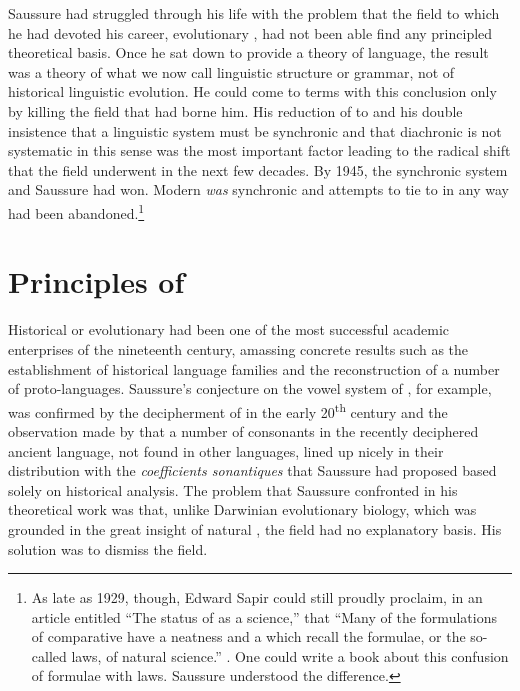 \documentclass[output=paper,
modfonts
]{LSP/langsci}
\begin{document}
Saussure had struggled through his life with the problem that the field to which he had devoted his career, evolutionary , had not been able find any principled theoretical basis. Once he sat down to provide a theory of language, the result was a theory of what we now call linguistic structure or grammar, not of historical linguistic evolution. He could come to terms with this conclusion only by killing the field that had borne him. His reduction of  to  and his double insistence that a linguistic system must be synchronic and that diachronic  is not systematic in this sense was the most important factor leading to the radical shift that the field underwent in the next few decades. By 1945, the synchronic system and Saussure had won. Modern  \textit{was} synchronic  and attempts to tie  to  in any way had been abandoned.\footnote{As late as 1929, though, Edward Sapir could still proudly proclaim, in an article entitled ``The status of  as a science,'' that ``Many of the formulations of comparative   have a neatness and a  which recall the formulae, or the so-called laws, of natural science.'' \citep[160]{sapir1929}. One could write a book about this confusion of formulae with laws. Saussure understood the difference.}

\section{Principles of }

Historical or evolutionary  had been one of the most successful academic enterprises of the nineteenth century, amassing concrete results such as the establishment of historical language families and the reconstruction of a number of proto-languages.  Saussure's conjecture on the vowel system of , for example, was confirmed by the decipherment of  in the early 20\textsuperscript{th} century and the observation made by \citet{Kurylowicz1935} that a number of consonants in the recently deciphered ancient  language, not found in other  languages, lined up nicely in their distribution with the  \textit{coefficients sonantiques} that Saussure had proposed based solely on historical analysis.  The problem that Saussure confronted in his theoretical work was that, unlike Darwinian evolutionary biology, which was grounded in the great insight of natural , the field had no explanatory basis. His solution was to dismiss the field.
\end{document}
